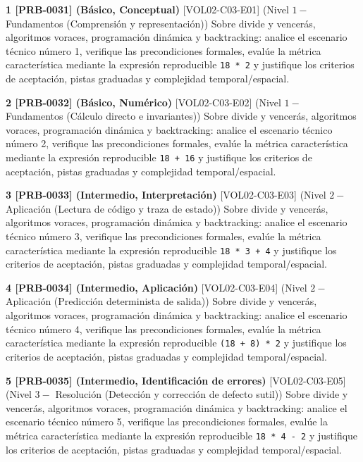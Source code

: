 \documentclass{book}
\begin{document}
\begin{tcolorbox}[title={Ejercicios}, studiumworked, breakable]

\noindent\textbf{1 [PRB-0031] (Básico, Conceptual)}
[VOL02-C03-E01] (Nivel \(1 -\) Fundamentos (Comprensión y representación)) Sobre divide y vencerás, algoritmos voraces, programación dinámica y backtracking: analice el escenario técnico número 1, verifique las precondiciones formales, evalúe la métrica característica mediante la expresión reproducible \texttt{18 * 2} y justifique los criterios de aceptación, pistas graduadas y complejidad temporal/espacial.

\noindent\textbf{2 [PRB-0032] (Básico, Numérico)}
[VOL02-C03-E02] (Nivel \(1 -\) Fundamentos (Cálculo directo e invariantes)) Sobre divide y vencerás, algoritmos voraces, programación dinámica y backtracking: analice el escenario técnico número 2, verifique las precondiciones formales, evalúe la métrica característica mediante la expresión reproducible \texttt{18 + 16} y justifique los criterios de aceptación, pistas graduadas y complejidad temporal/espacial.

\noindent\textbf{3 [PRB-0033] (Intermedio, Interpretación)}
[VOL02-C03-E03] (Nivel \(2 -\) Aplicación (Lectura de código y traza de estado)) Sobre divide y vencerás, algoritmos voraces, programación dinámica y backtracking: analice el escenario técnico número 3, verifique las precondiciones formales, evalúe la métrica característica mediante la expresión reproducible \texttt{18 * 3 + 4} y justifique los criterios de aceptación, pistas graduadas y complejidad temporal/espacial.

\noindent\textbf{4 [PRB-0034] (Intermedio, Aplicación)}
[VOL02-C03-E04] (Nivel \(2 -\) Aplicación (Predicción determinista de salida)) Sobre divide y vencerás, algoritmos voraces, programación dinámica y backtracking: analice el escenario técnico número 4, verifique las precondiciones formales, evalúe la métrica característica mediante la expresión reproducible \texttt{(18 + 8) * 2} y justifique los criterios de aceptación, pistas graduadas y complejidad temporal/espacial.

\noindent\textbf{5 [PRB-0035] (Intermedio, Identificación de errores)}
[VOL02-C03-E05] (Nivel \(3 -\) Resolución (Detección y corrección de defecto sutil)) Sobre divide y vencerás, algoritmos voraces, programación dinámica y backtracking: analice el escenario técnico número 5, verifique las precondiciones formales, evalúe la métrica característica mediante la expresión reproducible \texttt{18 * 4 - 2} y justifique los criterios de aceptación, pistas graduadas y complejidad temporal/espacial.


\end{tcolorbox}
\end{document}

